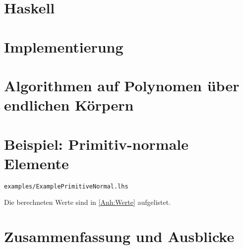 \documentclass[ngerman
  ,fontsize=11pt %
  ,numbers=noenddot %
  ,parskip=half*
  ,openany
  ,DIV=10
  ,fleqn %
  ,oneside
  ,DIV=10
]{./myClass}
\begin{document}
\ifnum{}
  \frontmatter
  
  \newpage \thispagestyle{empty} \mbox{}
\else
  \mainmatter
\fi

\tableofcontents{}


\ifnum{}
  \mainmatter
\fi

%

\chapter{Haskell}


\chapter{Implementierung}








\chapter{Algorithmen auf Polynomen über endlichen Körpern}
\label{chap:algs}





%
\chapter{Beispiel: Primitiv-normale Elemente}
\label{chap:bsp-prim-norm}
\texttt{examples/ExamplePrimitiveNormal.lhs}


Die berechneten Werte sind in \autoref{Anh:Werte} aufgelistet.


\chapter{Zusammenfassung und Ausblicke}


\pagebreak
\appendix
{}



\pagebreak
\printbibliography



\end{document}
